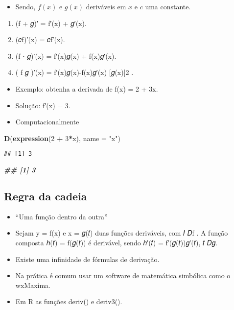 \documentclass[
]{article}
\newenvironment{Shaded}{\begin{snugshade}}{\end{snugshade}}
\newcommand{\AttributeTok}[1]{\textcolor[rgb]{0.13,0.29,0.53}{#1}}
\newcommand{\DecValTok}[1]{\textcolor[rgb]{0.00,0.00,0.81}{#1}}
\newcommand{\DocumentationTok}[1]{\textcolor[rgb]{0.56,0.35,0.01}{\textbf{\textit{#1}}}}
\newcommand{\FunctionTok}[1]{\textcolor[rgb]{0.13,0.29,0.53}{\textbf{#1}}}
\newcommand{\NormalTok}[1]{#1}
\newcommand{\SpecialCharTok}[1]{\textcolor[rgb]{0.81,0.36,0.00}{\textbf{#1}}}
\newcommand{\StringTok}[1]{\textcolor[rgb]{0.31,0.60,0.02}{#1}}
\providecommand{\tightlist}{%
  \setlength{\itemsep}{0pt}\setlength{\parskip}{0pt}}
\begin{document}
\begin{itemize}
\tightlist
\item
  Sendo, \(f(x)\) e \(g(x)\) deriváveis em \(x\) e \(c\) uma constante.
\end{itemize}

\begin{enumerate}
\def\labelenumi{\arabic{enumi}.}
\setcounter{enumi}{6}
\tightlist
\item
  (f + 𝑔)′ = f′(x) + 𝑔′(x).
\item
  (𝑐f)′(x) = 𝑐f′(x).
\item
  (f ⋅ 𝑔)′(x) = f′(x)𝑔(x) + f(x)𝑔′(x).
\item
  ( f 𝑔 )′(x) = f′(x)𝑔(x)-f(x)𝑔′(x) {[}𝑔(x){]}2 .
\end{enumerate}

\begin{itemize}
\tightlist
\item
  Exemplo: obtenha a derivada de f(x) = 2 + 3x.
\item
  Solução: f′(x) = 3.
\item
  Computacionalmente
\end{itemize}

\begin{Shaded}
\begin{Highlighting}[]
\FunctionTok{D}\NormalTok{(}\FunctionTok{expression}\NormalTok{(}\DecValTok{2} \SpecialCharTok{+} \DecValTok{3}\SpecialCharTok{*}\NormalTok{x), }\AttributeTok{name =} \StringTok{"x"}\NormalTok{)}
\end{Highlighting}
\end{Shaded}

\begin{verbatim}
## [1] 3
\end{verbatim}

\begin{Shaded}
\begin{Highlighting}[]
\DocumentationTok{\#\# [1] 3}
\end{Highlighting}
\end{Shaded}

\hypertarget{regra-da-cadeia}{%
\subsection{Regra da cadeia}\label{regra-da-cadeia}}

\begin{itemize}
\tightlist
\item
  ``Uma função dentro da outra''
\item
  Sejam y = f(x) e x = 𝑔(𝑡) duas funções deriváveis, com 𝐼 \in 𝐷f . A
  função composta ℎ(𝑡) = f(𝑔(𝑡)) é derivável, sendo ℎ′(𝑡) =
  f′(𝑔(𝑡))𝑔′(𝑡), 𝑡 \in 𝐷𝑔.
\item
  Existe uma infinidade de fórmulas de derivação.
\item
  Na prática é comum usar um software de matemática simbólica como o
  wxMaxima.
\item
  Em R as funções deriv() e deriv3().
\end{itemize}
\end{document}
